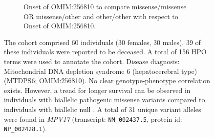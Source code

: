 \begin{figure}[htbp]\ContinuedFloat

\begin{subfigure}[b]{0.95\textwidth}
\captionsetup{justification=raggedright,singlelinecheck=false}
\caption{Onset of OMIM:256810 to compare missense/missense OR missense/other and other/other with respect to Onset of OMIM:256810.}
\end{subfigure}

\vspace{0.2em}

\caption{ The cohort comprised 60 individuals (30 females, 30 males). 39 of these individuals were reported to be deceased. 
A total of 156 HPO terms were used to annotate the cohort. Disease diagnosis: Mitochondrial DNA depletion syndrome 6 (hepatocerebral type) (MTDPS6; OMIM:256810). 
No clear genotype-phenotype correlation exists. However, a trend for longer survival can be observed in individuals with biallelic pathogenic 
missense variants compared to individuals with biallelic null \cite{PMID_20074988,PMID_22593919}. 
A total of 31 unique variant alleles were found in \textit{MPV17} (transcript: \texttt{NM\_002437.5}, protein id: \texttt{NP\_002428.1}).}
\end{figure}
